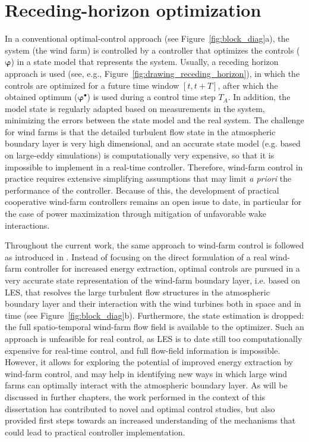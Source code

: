 \section{Receding-horizon optimization}\label{sec:problem_receding}
In a conventional optimal-control approach (see Figure~\ref{fig:block_diag}a), the system (the wind farm) is controlled by a controller that optimizes the controls ($\boldsymbol{\varphi}$) in a state model that represents the system. Usually, a receding horizon approach is used (see, e.g., Figure~\ref{fig:drawing_receding_horizon}), in which the controls are optimized for a future time window $[t,t+T]$, after which the obtained optimum ($\boldsymbol{\varphi}^{\bullet}$) is used during a control time step $T_A$. In addition, the model state is regularly adapted based on measurements in the system, minimizing the errors between the state model and the real system. The challenge for wind farms is that the detailed turbulent flow state in the atmospheric boundary layer is very high dimensional, and an accurate state model (e.g. based on large-eddy simulations) is computationally very expensive, so that it is impossible to implement in a real-time controller. Therefore, wind-farm control in practice requires extensive simplifying assumptions that may limit \emph{a priori} the performance of the controller. Because of this, the development of practical cooperative wind-farm controllers remains an open issue to date, in particular for the case of power maximization through mitigation of unfavorable wake interactions.

Throughout the current work, the same approach to wind-farm control is followed as introduced in \cite{goit2015optimal}. Instead of focusing on the direct formulation of a real wind-farm controller for increased energy extraction, optimal controls are pursued in a very accurate state representation of the wind-farm boundary layer, i.e. based on LES, that resolves the large turbulent flow structures in the atmospheric boundary layer and their interaction with the wind turbines both in space and in time (see Figure~\ref{fig:block_diag}b). Furthermore, the state estimation is dropped: the full spatio-temporal wind-farm flow field is available to the optimizer. Such an approach is unfeasible for real control, as LES is to date still too computationally expensive for real-time control, and full flow-field information is impossible. However, it allows for exploring the potential of improved energy extraction by wind-farm control, and may help in identifying new ways in which large wind farms can optimally interact with the atmospheric boundary layer. As will be discussed in further chapters, the work performed in the context of this dissertation has contributed to novel and optimal control studies, but also provided first steps towards an increased understanding of the mechanisms that could lead to practical controller implementation.

